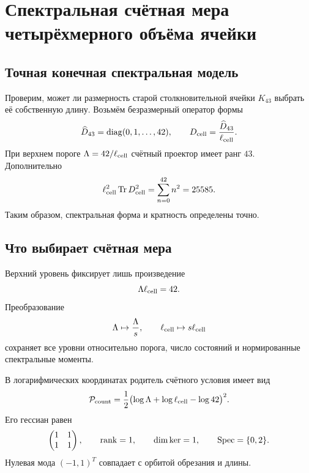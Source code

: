 \chapter{Спектральная счётная мера четырёхмерного объёма ячейки}
\label{ch:v10-cell-birth-four-volume-spectral-counting}

\section{Точная конечная спектральная модель}

Проверим, может ли размерность старой столкновительной ячейки $K_{43}$
выбрать её собственную длину. Возьмём безразмерный оператор формы
\begin{equation}
 \widehat D_{43}=\operatorname{diag}(0,1,\ldots,42),
 \qquad D_{\rm cell}=\frac{\widehat D_{43}}{\ell_{\rm cell}}.
 \label{eq:v10-spectral-counting-operator}
\end{equation}
При верхнем пороге $\Lambda=42/\ell_{\rm cell}$ счётный проектор имеет
ранг $43$. Дополнительно
\begin{equation}
 \ell_{\rm cell}^2\operatorname{Tr}D_{\rm cell}^2
 =\sum_{n=0}^{42}n^2=25585.
 \label{eq:v10-spectral-counting-moment}
\end{equation}
Таким образом, спектральная форма и кратность определены точно.

\section{Что выбирает счётная мера}

Верхний уровень фиксирует лишь произведение
\begin{equation}
 \Lambda\ell_{\rm cell}=42.
 \label{eq:v10-spectral-counting-product}
\end{equation}
Преобразование
\begin{equation}
 \Lambda\mapsto\frac{\Lambda}{s},
 \qquad \ell_{\rm cell}\mapsto s\ell_{\rm cell}
 \label{eq:v10-spectral-counting-orbit}
\end{equation}
сохраняет все уровни относительно порога, число состояний и нормированные
спектральные моменты.

В логарифмических координатах родитель счётного условия имеет вид
\begin{equation}
 \mathcal P_{\rm count}
 =\frac12\bigl(\log\Lambda+\log\ell_{\rm cell}-\log42\bigr)^2.
 \label{eq:v10-spectral-counting-parent}
\end{equation}
Его гессиан равен
\begin{equation}
 \begin{pmatrix}1&1\\1&1\end{pmatrix},
 \qquad \operatorname{rank}=1,
 \qquad \dim\ker=1,
 \qquad \operatorname{Spec}=\{0,2\}.
 \label{eq:v10-spectral-counting-hessian}
\end{equation}
Нулевая мода $(-1,1)^T$ совпадает с орбитой обрезания и длины.

